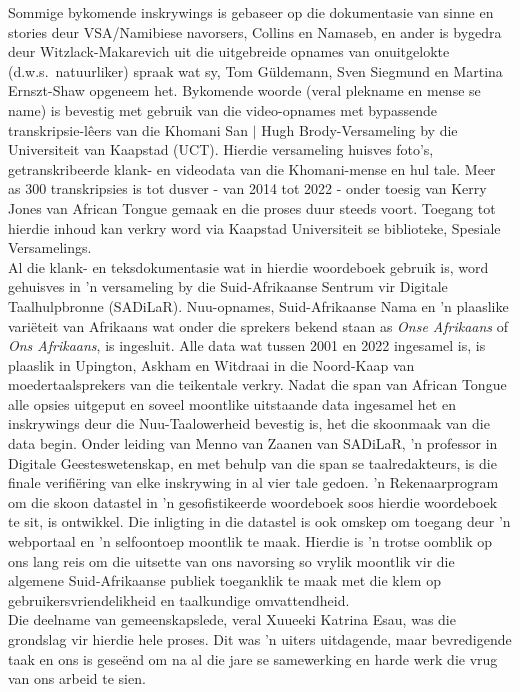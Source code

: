 Sommige bykomende inskrywings is gebaseer op die dokumentasie van
sinne en stories deur VSA/Namibiese navorsers, Collins en
Namaseb, en ander is bygedra deur Witzlack-Makarevich uit die
uitgebreide opnames van on\-uit\-gelokte (d.w.s.\ natuurliker) spraak wat
sy, Tom G\"{u}ldemann, Sven Siegmund en Martina Ernszt-Shaw opgeneem
het. Bykomende woorde (veral plekname en mense se name) is bevestig
met gebruik van die video-opnames met bypassende
transkripsie-l\^{e}ers van die \textipa{\textdoublebarpipe}Khomani San
$|$ Hugh Brody-Versameling by die Universiteit van Kaapstad (UCT).
Hierdie versameling huisves foto's, getranskribeerde klank- en
videodata van die \textipa{\textdoublebarpipe}Khomani-mense en hul
tale. Meer as 300 transkripsies is tot dusver - van 2014 tot 2022 -
onder toesig van Kerry Jones van African Tongue gemaak en die proses
duur steeds voort. Toegang tot hierdie inhoud kan verkry word via
Kaapstad Universiteit se biblioteke, Spesiale Versamelings.\\

Al die klank- en teksdokumentasie wat in hierdie woordeboek gebruik
is, word gehuisves in 'n versameling by die Suid-Afrikaanse Sentrum
vir Digitale Taalhulpbronne (SADiLaR).
N\textipa{\textvertline}uu-opnames, Suid-Afrikaanse Nama en 'n
plaaslike vari\"{e}teit van Afrikaans wat onder die sprekers bekend
staan as \emph{Onse Afrikaans} of \emph{Ons Afrikaans}, is ingesluit.
Alle data wat tussen 2001 en 2022 ingesamel is, is plaaslik in
Upington, Askham en Witdraai in die Noord-Kaap van moeder\-taal\-sprekers
van die teikentale verkry. Nadat die span van African Tongue alle
opsies uitgeput en soveel moontlike uitstaande data ingesamel het en
inskrywings deur die N\textipa{\textvertline}uu-Taalowerheid bevestig
is, het die skoonmaak van die data begin. Onder leiding van Menno van
Zaanen van SADiLaR, 'n professor in Digitale Geesteswetenskap, en met
behulp van die span se taalredakteurs, is die finale verifi\"{e}ring
van elke inskrywing in al vier tale gedoen. 'n Rekenaarprogram om die
skoon datastel in 'n gesofistikeerde woordeboek soos hierdie
woordeboek te sit, is ontwikkel. Die inligting in die datastel is ook
omskep om toegang deur 'n webportaal en 'n selfoontoep moontlik te
maak. \mbox{Hierdie} is 'n trotse oomblik op ons lang reis om die uitsette
van ons navorsing so vrylik moontlik vir die algemene Suid-Afrikaanse
publiek toeganklik te maak met die klem op gebruikersvriendelikheid en
taalkundige omvattendheid.\\

Die deelname van gemeenskapslede, veral
\textipa{\textdoublebarpipe}Xuu\textipa{\textvertline}eeki Katrina
Esau, was die grondslag vir hierdie hele proses. Dit was 'n uiters
uitdagende, maar bevredigende taak en ons is gese\"{e}nd om na al die
jare se samewerking en harde werk die vrug van ons arbeid te sien.


